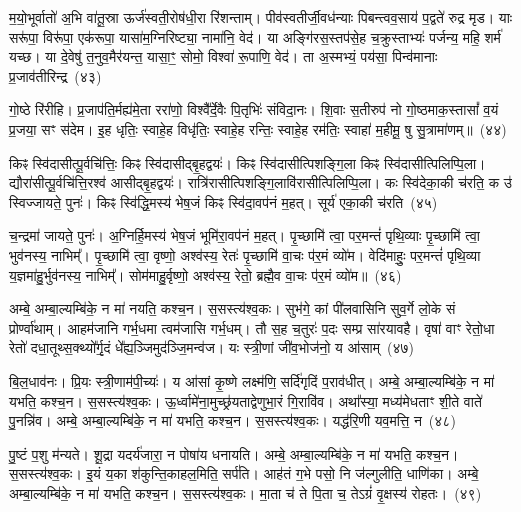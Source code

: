 {\anuvakamend[{नम॒ एका॒न्नत्रि॒ꣳ॒शत्}]}%

म॒यो॒भूर्वातो॑ अ॒भि वा॑तू॒स्रा ऊर्ज॑स्वती॒रोष॑धी॒रा रि॑शन्ताम्। पीव॑स्वतीर्जी॒वध॑न्याः पिबन्त्वव॒साय॑ प॒द्वते॑ रुद्र मृड। याः सरू॑पा॒ विरू॑पा॒ एक॑रूपा॒ यासा॑म॒ग्निरिष्ट्या॒ नामा॑नि॒ वेद॑। या अङ्गि॑रस॒स्तप॑से॒ह च॒क्रुस्ताभ्यः॑ पर्जन्य॒ महि॒ शर्म॑ यच्छ। या दे॒वेषु॑ त॒नुव॒मैर॑यन्त॒ यासा॒ꣳ॒ सोमो॒ विश्वा॑ रू॒पाणि॒ वेद॑। ता अ॒स्मभ्यं॒ पय॑सा॒ पिन्व॑मानाः प्र॒जाव॑तीरिन्द्र~(४३)\ip

गो॒ष्ठे रि॑रीहि। प्र॒जा\-प॑ति॒र्मह्य॑मे॒ता ररा॑णो॒ विश्वै᳚र्दे॒वैः पि॒तृभिः॑ संविदा॒नः। शि॒वाः स॒तीरुप॑ नो गो॒ष्ठमाक॒स्तासां᳚ व॒यं प्र॒जया॒ सꣳ स॑देम। इ॒ह धृतिः॒ स्वाहे॒ह विधृ॑तिः॒ स्वाहे॒ह रन्तिः॒ स्वाहे॒ह रम॑तिः॒ स्वाहा॑ म॒हीमू॒ षु सु॒त्रामा॑णम्॥~(४४)\ip

{\anuvakamend[{इ॒न्द्रा॒ष्टात्रिꣳ॑शच्च}]}%

किꣴ स्वि॑दासीत्पू॒र्वचि॑त्तिः॒ किꣴ स्वि॑दासीद्बृ॒हद्वयः॑। किꣴ स्वि॑दासीत्पिशङ्गि॒ला किꣴ स्वि॑दासीत्पिलिप्पि॒ला। द्यौरा॑सीत्पू॒र्वचि॑त्ति॒रश्व॑ आसीद्बृ॒हद्वयः॑। रात्रि॑रासीत्पिशङ्गि॒लावि॑रासीत्पिलिप्पि॒ला। कः स्वि॑देका॒की च॑रति॒ क उ॑ स्विज्जायते॒ पुनः॑। किꣴ स्वि॑द्धि॒मस्य॑ भेष॒जं किꣴ स्वि॑दा॒वप॑नं म॒हत्। सूर्य॑ एका॒की च॑रति~(४५)\ip

च॒न्द्रमा॑ जायते॒ पुनः॑। अ॒ग्निर्\mbox{}हि॒मस्य॑ भेष॒जं भूमि॑रा॒वप॑नं म॒हत्। पृ॒च्छामि॑ त्वा॒ पर॒मन्तं॑ पृथि॒व्याः पृ॒च्छामि॑ त्वा॒ भुव॑नस्य॒ नाभिम्᳚। पृ॒च्छामि॑ त्वा॒ वृष्णो॒ अश्व॑स्य॒ रेतः॑ पृ॒च्छामि॑ वा॒चः प॑र॒मं व्यो॑म। वेदि॑माहुः॒ पर॒मन्तं॑ पृथि॒व्या य॒ज्ञमा॑हु॒र्भुव॑नस्य॒ नाभिम्᳚। सोम॑माहु॒र्वृष्णो॒ अश्व॑स्य॒ रेतो॒ ब्रह्मै॒व वा॒चः प॑र॒मं व्यो॑म॥~(४६)\ip

{\anuvakamend[{सूर्य॑ एका॒की च॑रति॒ षट्च॑त्वारिꣳशच्च}]}%

अम्बे॒ अम्बा॒ल्यम्बि॑के॒ न मा॑ नयति॒ कश्च॒न। स॒सस्त्य॑श्व॒कः। सुभ॑गे॒ कां पी॑लवासिनि सुव॒र्गे लो॒के सं प्रोर्ण्वा॑थाम्। आहम॑जानि गर्भ॒धमा त्वम॑जासि गर्भ॒धम्। तौ स॒ह च॒तुरः॑ प॒दः सम्प्र सा॑रयावहै। वृषा॑ वाꣳ रेतो॒धा रेतो॑ दधा॒तूथ्स॒क्थ्यो᳚र्गृ॒दं धे᳚ह्य॒ञ्जिमुद॑ञ्जि॒मन्व॑ज। यः स्त्री॒णां जी॑व॒भोज॑नो॒ य आ॑साम्~(४७)\ip

बि॒ल॒धाव॑नः। प्रि॒यः स्त्री॒णाम॑पी॒च्यः॑। य आ॑सां कृ॒ष्णे लक्ष्म॑णि॒ सर्दि॑गृदिं प॒राव॑धीत्। अम्बे॒ अम्बा॒ल्यम्बि॑के॒ न मा॑ यभति॒ कश्च॒न। स॒सस्त्य॑श्व॒कः। ऊ॒र्ध्वामे॑ना॒मुच्छ्र॑यताद्वेणुभा॒रं गि॒रावि॑व। अथा᳚स्या॒ मध्य॑मेधताꣳ शी॒ते वाते॑ पु॒नन्नि॑व। अम्बे॒ अम्बा॒ल्यम्बि॑के॒ न मा॑ यभति॒ कश्च॒न। स॒सस्त्य॑श्व॒कः। यद्ध॑रि॒णी यव॒मत्ति॒ न~(४८)\ip

पु॒ष्टं प॒शु म॑न्यते। शू॒द्रा यदर्य॑जारा॒ न पोषा॑य धनायति। अम्बे॒ अम्बा॒ल्यम्बि॑के॒ न मा॑ यभति॒ कश्च॒न। स॒सस्त्य॑श्व॒कः। इ॒यं य॒का श॑कुन्ति॒काहल॒मिति॒ सर्प॑ति। आह॑तं ग॒भे पसो॒ नि ज॑ल्गुलीति॒ धाणि॑का। अम्बे॒ अम्बा॒ल्यम्बि॑के॒ न मा॑ यभति॒ कश्च॒न। स॒सस्त्य॑श्व॒कः। मा॒ता च॑ ते पि॒ता च॒ ते\-ऽग्रं॑ वृ॒क्षस्य॑ रोहतः।~(४९)\ip

